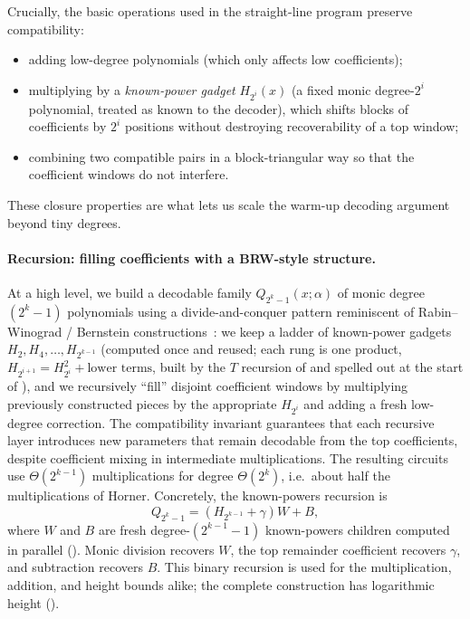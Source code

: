 Crucially, the basic operations used in the straight-line program preserve compatibility:
\begin{itemize}
   \item adding low-degree polynomials (which only affects low coefficients);
   \item multiplying by a \emph{known-power gadget} $H_{2^i}(x)$ (a fixed monic degree-$2^i$ polynomial, treated as known to the decoder),
         which shifts blocks of coefficients by $2^i$ positions without destroying recoverability of a top window;
   \item combining two compatible pairs in a block-triangular way so that the coefficient windows do not interfere.
\end{itemize}
These closure properties are what lets us scale the warm-up decoding argument beyond tiny degrees.

\paragraph{Recursion: filling coefficients with a BRW-style structure.}
At a high level, we build a decodable family $Q_{2^k-1}(x;\alpha)$ of monic degree $(2^k-1)$ polynomials using a divide-and-conquer pattern reminiscent of Rabin--Winograd / Bernstein constructions~\cite{rabin1972number}:
we keep a ladder of known-power gadgets $H_2,H_4,\dots,H_{2^{k-1}}$ (computed once and reused;
each rung is one product, $H_{2^{i+1}}=H_{2^i}^2+\text{lower terms}$, built by the $T$ recursion of
 and spelled out at the start of ),
and we recursively ``fill'' disjoint coefficient windows by multiplying previously constructed pieces by the appropriate $H_{2^i}$ and adding a fresh low-degree correction.
The compatibility invariant guarantees that each recursive layer introduces new parameters that remain decodable from the top coefficients, despite coefficient mixing in intermediate multiplications.
The resulting circuits use $\Theta(2^{k-1})$ multiplications for degree $\Theta(2^k)$, i.e.\ about half the multiplications of Horner.
Concretely, the known-powers recursion is
\[
  Q_{2^k-1}=(H_{2^{k-1}}+\gamma)W+B,
\]
where $W$ and $B$ are fresh degree-$(2^{k-1}-1)$ known-powers children
computed in parallel ().
Monic division recovers $W$, the top remainder coefficient recovers
$\gamma$, and subtraction recovers $B$.
This binary recursion is used for the multiplication, addition, and
height bounds alike; the complete construction has logarithmic height
().


